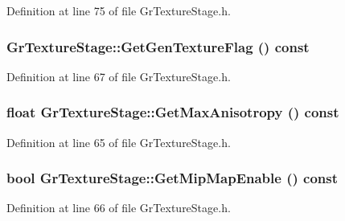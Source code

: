 \begin{CompactItemize}
Definition at line 75 of file GrTextureStage.h.\hypertarget{class_gr_texture_stage_b402fe22422a4bd70bb8ae1350a7eb14}{
\subsubsection[{GetGenTextureFlag}]{ GrTextureStage::GetGenTextureFlag () const}}
\label{class_gr_texture_stage_b402fe22422a4bd70bb8ae1350a7eb14}




Definition at line 67 of file GrTextureStage.h.\hypertarget{class_gr_texture_stage_426da5e8a0ae8225728c287a4d2abdd8}{
\subsubsection[{GetMaxAnisotropy}]{\setlength{\rightskip}{0pt plus 5cm}float GrTextureStage::GetMaxAnisotropy () const}}
\label{class_gr_texture_stage_426da5e8a0ae8225728c287a4d2abdd8}




Definition at line 65 of file GrTextureStage.h.\hypertarget{class_gr_texture_stage_216e2a31963f9e4f10096c0c42795279}{
\subsubsection[{GetMipMapEnable}]{\setlength{\rightskip}{0pt plus 5cm}bool GrTextureStage::GetMipMapEnable () const}}
\label{class_gr_texture_stage_216e2a31963f9e4f10096c0c42795279}




Definition at line 66 of file GrTextureStage.h.\hypertarget{class_gr_texture_stage_be60ecb1b07e9e3765c5c5119eaa114f}{
}
\end{CompactItemize}
